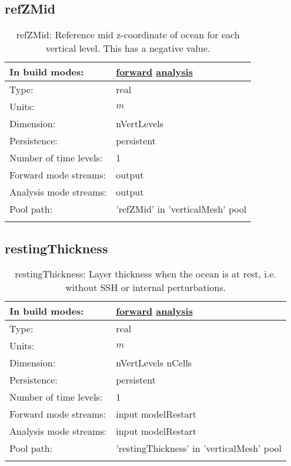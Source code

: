 \subsection[refZMid]{refZMid}
\label{subsec:var_sec_verticalMesh_refZMid}
\begin{center}
\begin{longtable}{| p{2.0in} | p{4.0in} |}
        \hline 
        In build modes: & \hyperref[subsec:forward_var_tab_verticalMesh]{forward} \hyperref[subsec:analysis_var_tab_verticalMesh]{analysis} \\
        \hline 
        Type: & real \\
        \hline 
        Units: & $m$ \\
        \hline 
        Dimension: & nVertLevels \\
        \hline 
        Persistence: & persistent \\
        \hline 
        Number of time levels: & 1 \\
        \hline 
		 Forward mode streams: &  output \\
        \hline 
		 Analysis mode streams: &  output \\
        \hline 
            Pool path: & 'refZMid' in 'verticalMesh' pool
 \\
		 \hline 
    \caption{refZMid: Reference mid z-coordinate of ocean for each vertical level. This has a negative value.}
\end{longtable}
\end{center}
\subsection[restingThickness]{restingThickness}
\label{subsec:var_sec_verticalMesh_restingThickness}
\begin{center}
\begin{longtable}{| p{2.0in} | p{4.0in} |}
        \hline 
        In build modes: & \hyperref[subsec:forward_var_tab_verticalMesh]{forward} \hyperref[subsec:analysis_var_tab_verticalMesh]{analysis} \\
        \hline 
        Type: & real \\
        \hline 
        Units: & $m$ \\
        \hline 
        Dimension: & nVertLevels nCells \\
        \hline 
        Persistence: & persistent \\
        \hline 
        Number of time levels: & 1 \\
        \hline 
		 Forward mode streams: &  input modelRestart \\
        \hline 
		 Analysis mode streams: &  input modelRestart \\
        \hline 
            Pool path: & 'restingThickness' in 'verticalMesh' pool
 \\
		 \hline 
    \caption{restingThickness: Layer thickness when the ocean is at rest, i.e. without SSH or internal perturbations.}
\end{longtable}
\end{center}
